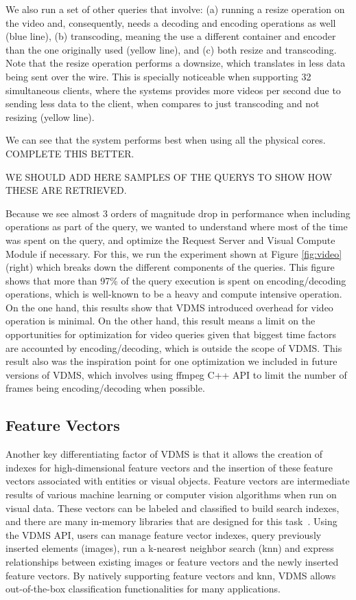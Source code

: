 We also run a set of other queries that involve: (a) running a resize operation
on the video and, consequently, needs a decoding and
encoding operations as well (blue line),
(b) transcoding, meaning the use a different container and encoder
than the one originally used (yellow line), and (c) both resize and transcoding.
Note that the resize operation performs a downsize, which translates in less
data being sent over the wire. This is specially noticeable when supporting 32
simultaneous clients, where the systems provides more videos per second due to
sending less data to the client, when compares to just transcoding and not resizing (yellow line).

We can see that the system performs best when using all the physical cores.
COMPLETE THIS BETTER.

WE SHOULD ADD HERE SAMPLES OF THE QUERYS TO SHOW HOW THESE ARE RETRIEVED.

Because we see almost 3 orders of magnitude drop in performance when including
operations as part of the query, we wanted to understand where most of the time
was spent on the query, and optimize the Request Server and Visual Compute Module
if necessary. For this, we run the experiment shown at
Figure \ref{fig:video} (right) which breaks down the different components of the
queries. This figure shows that more than 97\% of the query execution is spent
on encoding/decoding operations, which is well-known to be a
heavy and compute intensive operation.
On the one hand, this results show that VDMS introduced overhead for
video operation is minimal. On the other hand, this result means a
limit on the opportunities for optimization for video queries given
that biggest time factors are accounted by encoding/decoding, which is
outside the scope of VDMS.
This result also was the inspiration point for one optimization we included
in future versions of VDMS, which involves using ffmpeg C++ API to
limit the number of frames being encoding/decoding when possible.


\subsection{Feature Vectors}

Another key differentiating factor of VDMS is that it allows the creation of
indexes for high-dimensional feature vectors and the insertion of
these feature vectors associated with entities or visual objects.
Feature vectors are intermediate results of various machine
learning or computer vision algorithms when run on visual data.
These vectors can be labeled and classified to build search indexes,
and there are many in-memory libraries that are designed for
this task~\cite{flann, faiss}.
Using the VDMS API, users can manage feature vector indexes,
query previously inserted elements (images),
run a k-nearest neighbor search (knn) and express relationships
between existing images or feature vectors and
the newly inserted feature vectors.
By natively supporting feature vectors and knn,
VDMS allows out-of-the-box classification
functionalities for many applications.

